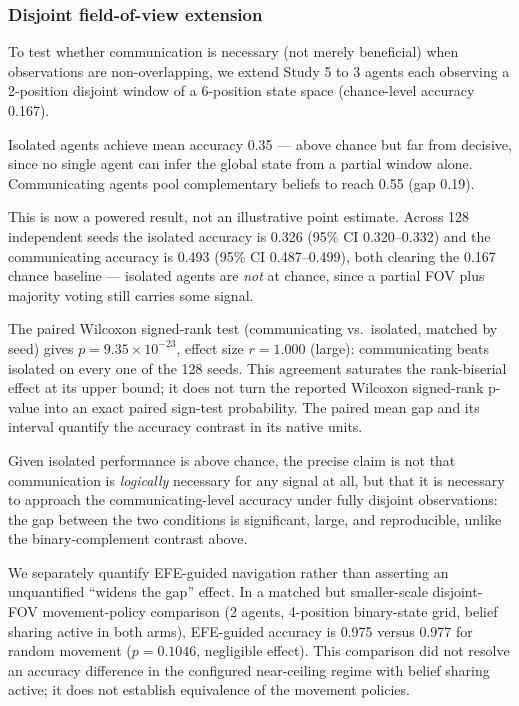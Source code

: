 \documentclass[
  english,
]{article}
\theoremstyle{plain}
\theoremstyle{definition}
\theoremstyle{remark}
\theoremstyle{definition}
\begin{document}
\subsubsection{Disjoint field-of-view
extension}\label{sec:results-disjoint-fov}

To test whether communication is necessary (not merely beneficial) when
observations are non-overlapping, we extend Study 5 to 3 agents each
observing a 2-position disjoint window of a 6-position state space
(chance-level accuracy 0.167).

Isolated agents achieve mean accuracy 0.35 --- above chance but far from
decisive, since no single agent can infer the global state from a
partial window alone. Communicating agents pool complementary beliefs to
reach 0.55 (gap 0.19).

This is now a powered result, not an illustrative point estimate. Across
128 independent seeds the isolated accuracy is 0.326 (95\% CI
0.320--0.332) and the communicating accuracy is 0.493 (95\% CI
0.487--0.499), both clearing the 0.167 chance baseline --- isolated
agents are \emph{not} at chance, since a partial FOV plus majority
voting still carries some signal.

The paired Wilcoxon signed-rank test (communicating vs.~isolated,
matched by seed) gives \(p = 9.35 \times 10^{-23}\), effect size
\(r = 1.000\) (large): communicating beats isolated on every one of the
128 seeds. This agreement saturates the rank-biserial effect at its
upper bound; it does not turn the reported Wilcoxon signed-rank p-value
into an exact paired sign-test probability. The paired mean gap and its
interval quantify the accuracy contrast in its native units.

Given isolated performance is above chance, the precise claim is not
that communication is \emph{logically} necessary for any signal at all,
but that it is necessary to approach the communicating-level accuracy
under fully disjoint observations: the gap between the two conditions is
significant, large, and reproducible, unlike the binary-complement
contrast above.

We separately quantify EFE-guided navigation rather than asserting an
unquantified ``widens the gap'' effect. In a matched but smaller-scale
disjoint-FOV movement-policy comparison (2 agents, 4-position
binary-state grid, belief sharing active in both arms), EFE-guided
accuracy is 0.975 versus 0.977 for random movement (\(p = 0.1046\),
negligible effect). This comparison did not resolve an accuracy
difference in the configured near-ceiling regime with belief sharing
active; it does not establish equivalence of the movement policies.
\end{document}
